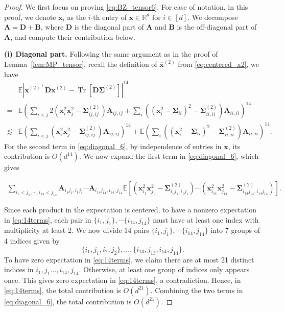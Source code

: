 \documentclass[twoside,11pt]{article}
\newcommand{\R}{\mathbb{R}}
\newcommand{\E}{\mathbb{E}}
\def\bA{{\boldsymbol A}}
\def\bB{{\boldsymbol B}}
\def\bD{{\boldsymbol D}}
\def\bx{{\boldsymbol x}}
\def\bSigma{{\boldsymbol \Sigma}}
\newcommand{\Tr}{\operatorname{Tr}}
\newcommand{\x}{\boldsymbol{x}}
\newcommand{\1}{\mathbf{1}}
\begin{document}
\begin{proof}
We first focus on proving \eqref{eq:BZ_tensor6}. For ease of notation, in this proof, we denote $\bx_i$ as the $i$-th entry of $\bx\in\R^d$ for $i\in [d]$.  
We decompose $\bA=\bD+\bB$, where $\bD$ is the diagonal part of $\bA$ and $\bB$ is the off-diagonal part of $\bA$, and compute their contribution below.

    \textbf{ (i) Diagonal part.} Following the same argument as in the proof of Lemma~\ref{lem:MP_tensor}, recall the definition of $\overline{\bx}^{(2)}$ from \eqref{eq:centered_x2}, we have 
    \begin{align}
    &\E\left| {\overline\bx^{(2)}}^\top \bD\overline\bx^{(2)}-\Tr[\bD\bSigma^{(2)}]\right|^{14}\\
    =&\E \left( \sum_{i<j}2(\bx_i^2 \bx_j^2-\bSigma_{ij,ij}^{(2)})\bA_{ij,ij} +\sum_{i} ((\bx_i^2-\bSigma_{ii})^2-\bSigma_{ii,ii}^{(2)}) \bA_{ii,ii}\right)^{14}\\
    \lesssim &\E \left( \sum_{i<j}(\bx_i^2 \bx_j^2-\bSigma_{ij,ij}^{(2)})\bA_{ij,ij}\right)^{14}+\E \left( \sum_{i} ((\bx_i^2-\bSigma_{ii})^2-\bSigma_{ii,ii}^{(2)}) \bA_{ii,ii}\right)^{14}. \label{eq:diagonal_6}
    \end{align}
    For the second term in \eqref{eq:diagonal_6}, by independence of entries in $\bx$, its contribution is $O(d^{14})$. 
        We now expand the first term in \eqref{eq:diagonal_6}, which gives  
        \begin{small}
    \begin{align}
        \sum_{i_1<j_1,\cdots, i_{14}<j_{14}}\bA_{i_1j_1,i_1j_1}\cdots \bA_{i_{14}j_{14},i_{14},j_{14}}\E\left[(\x_{i_1}^2\x_{j_1}^2-\bSigma_{i_1j_1,i_1j_1}^{(2)})\cdots (\x_{i_{14}}^2\x_{j_{14}}^2-\bSigma_{i_{14}j_{14},i_{14}j_{14}}^{(2)})\right].~~~~ \label{eq:14terms}
    \end{align}
    \end{small}
Since each product in the expectation is centered, to have a nonzero expectation in \eqref{eq:14terms}, each pair in $\{i_1,j_1\},\cdots \{i_{14},j_{14}\}$ must have at least one index with multiplicity at least 2. 
We now divide 14 pairs $\{i_1,j_1\},\cdots \{i_{14},j_{14}\}$ into 7  groups of 4 indices given by  \[\{i_1,j_1,i_2,j_2\},\dots, \{i_{13},j_{13},i_{14},j_{14}\}.\] 
To have zero expectation in \eqref{eq:14terms}, we claim there are at most 21 distinct indices in $i_1,j_1\dots,i_{14},j_{14}$. Otherwise, at least one group of indices only appears once. This gives zero expectation in \eqref{eq:14terms}, a contradiction. Hence, in \eqref{eq:14terms}, the total contribution is $O(d^{21})$.
Combining the two terms in \eqref{eq:diagonal_6}, the total contribution is $O(d^{21})$.


\end{proof}
\end{document}
